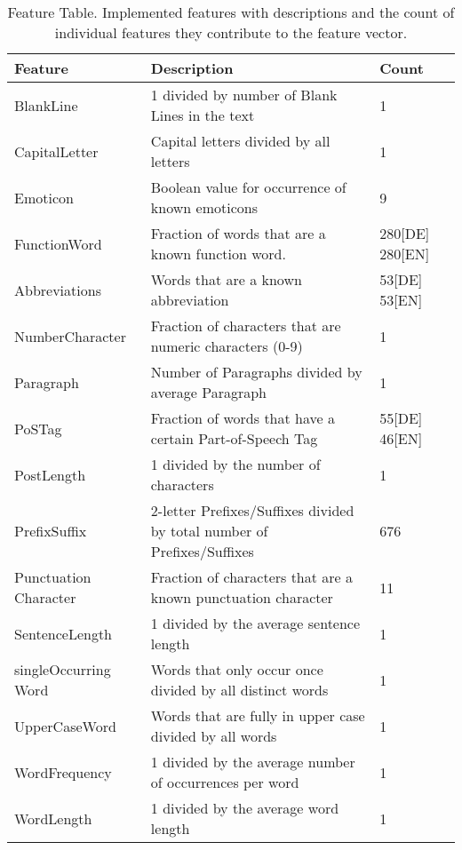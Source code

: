 \begin{table}[h]
    \begin{center}
    \begin{tabular}{p{2.6cm}|p{8.2cm}|p{1.2cm}}
    Feature					& Description																& Count				\\ \hline \hline
    BlankLine				& 1 divided by number of Blank Lines in the text							& 1					\\ \hline
    CapitalLetter			& Capital letters divided by all letters									& 1					\\ \hline
    Emoticon				& Boolean value for occurrence of known emoticons							& 9					\\ \hline
    FunctionWord			& Fraction of words that are a known function word.							& 280[DE] 280[EN]	\\ \hline
    Abbreviations			& Words that are a known abbreviation										& 53[DE] 53[EN]		\\ \hline
    NumberCharacter			& Fraction of characters that are numeric characters (0-9)					& 1					\\ \hline
    Paragraph				& Number of Paragraphs divided by average Paragraph							& 1					\\ \hline
    PoSTag					& Fraction of words that have a certain Part-of-Speech Tag                  & 55[DE] 46[EN]  	\\ \hline
    PostLength				& 1 divided by the number of characters										& 1					\\ \hline
    PrefixSuffix			& 2-letter Prefixes/Suffixes divided by total number of Prefixes/Suffixes	& 676 			 	\\ \hline
    Punctuation Character	& Fraction of characters that are a known punctuation character				& 11				\\ \hline
    SentenceLength			& 1 divided by the average sentence length									& 1 				\\ \hline
    singleOccurring Word	& Words that only occur once divided by all distinct words					& 1					\\ \hline
    UpperCaseWord			& Words that are fully in upper case divided by all words					& 1					\\ \hline
    WordFrequency			& 1 divided by the average number of occurrences per word					& 1					\\ \hline
    WordLength				& 1 divided by the average word length										& 1					\\
    \end{tabular}
    \end{center}
	\caption{Feature Table. Implemented features with descriptions and the count of individual features they contribute to the feature vector.}
	\label{tab:featureTable}
\end{table}
